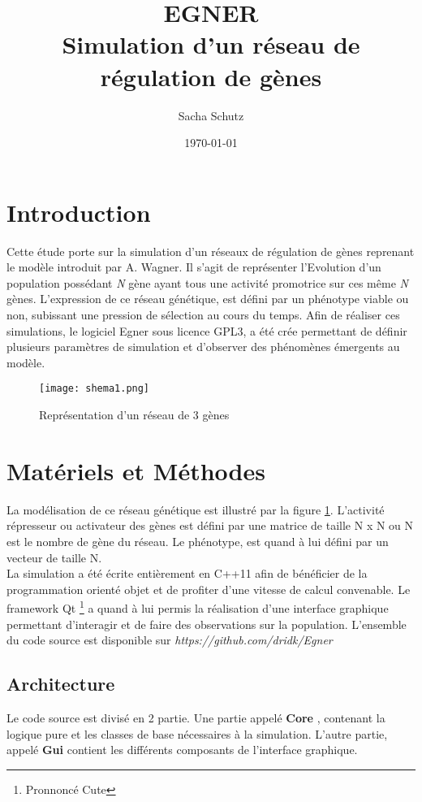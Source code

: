 \documentclass{article}
\title {EGNER\\ Simulation d'un réseau de régulation de gènes}
\author {Sacha Schutz}
\date {\today}
\begin{document}
	\maketitle

	\section{Introduction} %
	Cette étude porte sur la simulation d'un réseaux de régulation de gènes reprenant le modèle introduit par A. Wagner. Il s'agit de représenter l'Evolution d'un population possédant \emph{N} gène ayant tous une activité promotrice sur ces même \emph{N} gènes. L'expression de ce réseau génétique, est défini par un phénotype viable ou non, subissant une pression de sélection au cours du temps. Afin de réaliser ces simulations, le logiciel Egner sous licence GPL3, a été crée permettant de définir plusieurs paramètres de simulation et d'observer des phénomènes émergents au modèle.

	\begin{figure}[h]
	\caption[test]{Représentation d'un réseau de 3 gènes }
	\centering
	\texttt{[image: shema1.png]}
	\label{figure1}
	\end{figure}

	\section{Matériels et Méthodes} 
	La modélisation de ce réseau génétique est illustré par la figure \ref{figure1}. L'activité répresseur ou activateur des gènes est défini par une matrice de taille N x N ou N est le nombre de gène du réseau. Le phénotype, est quand à lui défini par un vecteur de taille N. \\
	La simulation a été écrite entièrement en C++11 afin de bénéficier de la programmation orienté objet et de profiter d'une vitesse de calcul convenable. Le framework Qt \footnote{Pronnoncé Cute} a quand à lui permis la réalisation d'une interface graphique permettant d'interagir et de faire des observations sur la population. L'ensemble du code source est disponible sur \emph{https://github.com/dridk/Egner}
	\subsection {Architecture}
	Le code source est divisé en 2 partie. Une partie appelé \textbf{Core} , contenant la logique pure et les classes de base nécessaires à la simulation. L'autre partie, appelé \textbf{Gui} contient les différents composants de l'interface graphique.
\end{document}
